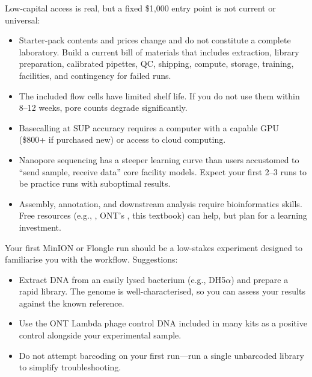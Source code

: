 \begin{warningbox}[title={Honest Expectations}]
Low-capital access is real, but a fixed \$1,000 entry point is not current or universal:
\begin{itemize}[nosep]
  \item Starter-pack contents and prices change and do not constitute a complete laboratory. Build a current bill of materials that includes extraction, library preparation, calibrated pipettes, QC, shipping, compute, storage, training, facilities, and contingency for failed runs.
  \item The included flow cells have limited shelf life. If you do not use them within 8--12 weeks, pore counts degrade significantly.
  \item Basecalling at SUP accuracy requires a computer with a capable GPU (\$800+ if purchased new) or access to cloud computing.
  \item Nanopore sequencing has a steeper learning curve than users accustomed to ``send sample, receive data'' core facility models. Expect your first 2--3 runs to be practice runs with suboptimal results.
  \item Assembly, annotation, and downstream analysis require bioinformatics skills. Free resources (e.g., , \acrshort{ONT}'s , this textbook) can help, but plan for a learning investment.
\end{itemize}
\end{warningbox}

\begin{tipbox}[title={Maximising the Value of Your First Flow Cell}]
Your first MinION or Flongle run should be a low-stakes experiment designed to familiarise you with the workflow. Suggestions:
\begin{itemize}[nosep]
  \item Extract DNA from an easily lysed bacterium (e.g.,  DH5$\alpha$) and prepare a rapid library. The genome is well-characterised, so you can assess your results against the known reference.
  \item Use the \acrshort{ONT} Lambda phage control DNA included in many kits as a positive control alongside your experimental sample.
  \item Do not attempt barcoding on your first run---run a single unbarcoded library to simplify troubleshooting.
\end{itemize}
\end{tipbox}


